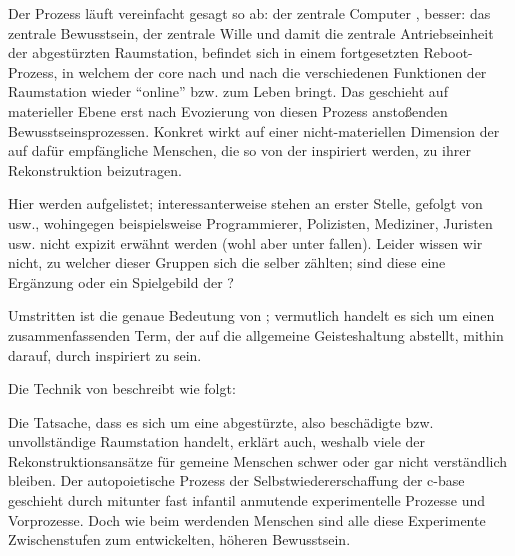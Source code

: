 \begin{newstuff}
    Der Prozess läuft vereinfacht gesagt so ab: der zentrale Computer , besser: das zentrale Bewusstsein, der zentrale Wille und damit die zentrale Antriebseinheit der abgestürzten Raumstation, befindet sich in einem fortgesetzten Reboot-Prozess, in welchem der {core} nach und nach die verschiedenen Funktionen der Raumstation wieder "`online"' bzw. zum Leben bringt. Das geschieht auf materieller Ebene erst nach Evozierung von diesen Prozess anstoßenden  Bewusstseinsprozessen. Konkret wirkt auf einer nicht-materiellen Dimension der  auf dafür empfängliche Menschen, die so von der  inspiriert werden, zu ihrer Rekonstruktion beizutragen. 


    Hier werden  aufgelistet; interessanterweise stehen  an erster Stelle, gefolgt von  usw., wohingegen beispielsweise Programmierer, Polizisten, Mediziner, Juristen usw. nicht expizit erwähnt werden (wohl aber unter  fallen). Leider wissen wir nicht, zu welcher dieser Gruppen sich die  selber zählten; sind diese  eine Ergänzung oder ein Spielgebild der ?
    
    Umstritten ist die genaue Bedeutung von ; vermutlich handelt es sich um einen zusammenfassenden Term, der auf die allgemeine Geisteshaltung abstellt, mithin darauf, durch  inspiriert zu sein.

    Die Technik von  beschreibt  wie folgt:
    
    Die Tatsache, dass es sich um eine abgestürzte, also beschädigte bzw. unvollständige Raumstation handelt, erklärt auch, weshalb viele der Rekonstruktionsansätze für gemeine Menschen schwer oder gar nicht verständlich bleiben. Der autopoietische Prozess der Selbstwiedererschaffung der c-base geschieht durch mitunter fast infantil anmutende experimentelle Prozesse und Vorprozesse. Doch wie beim werdenden Menschen sind alle diese Experimente Zwischenstufen zum entwickelten, höheren Bewusstsein.  


\end{newstuff}
